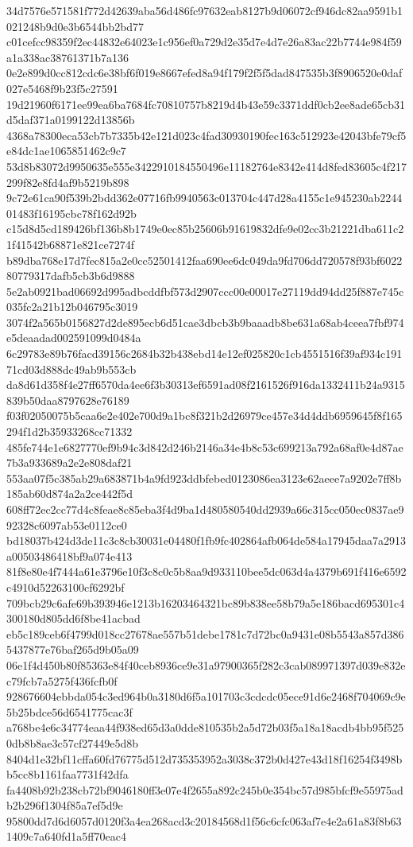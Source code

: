 {34d7576e571581f772d42639aba56d486fc97632eab8127b9d06072cf946dc82aa9591b1021248b9d0e3b6544bb2bd77
c01cefcc98359f2ec44832e64023e1c956ef0a729d2e35d7e4d7e26a83ac22b7744e984f59a1a338ac38761371b7a136
0e2e899d0cc812cdc6e38bf6f019e8667efed8a94f179f2f5f5dad847535b3f8906520e0daf027e5468f9b23f5c27591
19d21960f6171ee99ea6ba7684fc70810757b8219d4b43e59c3371ddf0cb2ee8ade65cb31d5daf371a0199122d13856b
4368a78300eca53cb7b7335b42e121d023c4fad30930190fec163c512923e42043bfe79cf5e84dc1ae1065851462c9c7
53d8b83072d9950635e555e3422910184550496e11182764e8342e414d8fed83605c4f217299f82e8fd4af9b5219b898
9c72e61ca90f539b2bdd362e07716fb9940563c013704c447d28a4155c1e945230ab224401483f16195cbc78f162d92b
c15d8d5cd189426bf136b8b1749e0ec85b25606b91619832dfe9e02cc3b21221dba611c21f41542b68871e821ce7274f
b89dba768e17d7fec815a2e0cc52501412faa690ee6dc049da9fd706dd720578f93bf602280779317dafb5cb3b6d9888
5e2ab0921bad06692d995adbcddfbf573d2907ccc00e00017e27119dd94dd25f887e745c035fc2a21b12b046795c3019
3074f2a565b0156827d2de895ecb6d51cae3dbcb3b9baaadb8be631a68ab4ceea7fbf974e5deaadad002591099d0484a
6c29783e89b76facd39156c2684b32b438ebd14e12ef025820c1cb4551516f39af934c19171cd03d888dc49ab9b553cb
da8d61d358f4e27ff6570da4ee6f3b30313ef6591ad08f2161526f916da1332411b24a9315839b50daa8797628e76189
f03f02050075b5caa6e2e402e700d9a1bc8f321b2d26979ce457e34d4ddb6959645f8f165294f1d2b35933268cc71332
485fe744e1e6827770ef9b94c3d842d246b2146a34e4b8c53c699213a792a68af0e4d87ae7b3a933689a2e2e808daf21
553aa07f5c385ab29a683871b4a9fd923ddbfebed0123086ea3123e62aeee7a9202e7ff8b185ab60d874a2a2ce442f5d
608ff72ec2cc77d4c8feae8c85eba3f4d9ba1d480580540dd2939a66c315cc050ec0837ae992328c6097ab53e0112ce0
bd18037b424d3de11c3c8cb30031e04480f1fb9fc402864afb064de584a17945daa7a2913a00503486418bf9a074e413
81f8e80e4f7444a61e3796e10f3c8c0c5b8aa9d933110bee5dc063d4a4379b691f416e6592c4910d52263100cf6292bf
709bcb29c6afe69b393946e1213b16203464321bc89b838ee58b79a5e186bacd695301c4300180d805dd6f8be41acbad
eb5c189ceb6f4799d018cc27678ae557b51debe1781c7d72bc0a9431e08b5543a857d3865437877e76baf265d9b05a09
06e1f4d450b80f85363e84f40ceb8936ce9e31a97900365f282c3cab089971397d039e832ec79fcb7a5275f436fcfb0f
928676604ebbda054c3ed964b0a3180d6f5a101703c3cdcdc05ece91d6e2468f704069c9e5b25bdce56d6541775cac3f
a768be4e6c34774eaa44f938ed65d3a0dde810535b2a5d72b03f5a18a18acdb4bb95f5250db8b8ae3c57cf27449e5d8b
8404d1e32bf11cffa60fd76775d512d735353952a3038c372b0d427e43d18f16254f3498bb5cc8b1161faa7731f42dfa
fa4408b92b238cb72bf9046180ff3e07e4f2655a892c245b0e354bc57d985bfcf9e55975adb2b296f1304f85a7ef5d9e
95800dd7d6d6057d0120f3a4ea268acd3c20184568d1f56c6cfc063af7e4e2a61a83f8b631409c7a640fd1a5ff70eac4
}
